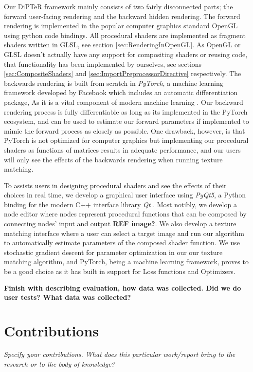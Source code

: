 Our DiPTeR framework mainly consists of two fairly disconnected parts; the forward user-facing rendering and the backward hidden rendering. The forward rendering is implemented in the popular computer graphics standard OpenGL using python code bindings. All procedural shaders are implemented as fragment shaders written in GLSL, see section \ref{sec:RenderingInOpenGL}. As OpenGL or GLSL doesn't actually have any support for compositing shaders or reusing code, that functionality has been implemented by ourselves, see sections \ref{sec:CompositeShaders} and \ref{sec:ImportPreprocessorDirective} respectively. The backwards rendering is built from scratch in \textit{PyTorch}, a machine learning framework developed by Facebook which includes an automatic differentiation package, As it is a vital component of modern machine learning \cite{paszke_2019_pytorch}. Our backward rendering process is fully differentiable as long as its implemented in the PyTorch ecosystem, and can be used to estimate our forward parameters if implemented to mimic the forward process as closely as possible. One drawback, however, is that PyTorch is not optimized for computer graphics but implementing our procedural shaders as functions of matrices results in adequate performance, and our users will only see the effects of the backwards rendering when running texture matching.

To assists users in designing procedural shaders and see the effects of their choices in real time, we develop a graphical user interface using \textit{PyQt5}, a Python binding for the modern C++ interface library \textit{Qt} \cite{theqtcompany_qt}. Most notibly, we develop a node editor where nodes represent procedural functions that can be composed by connecting nodes' input and output \textbf{REF image?}. We also develop a texture matching interface where a user can select a target image and run our algorithm to automatically estimate parameters of the composed shader function. We use stochastic gradient descent for parameter optimization in our our texture matching algorithm, and PyTorch, being a machine learning framework, proves to be a good choice as it has built in support for Loss functions and Optimizers.

\textbf{Finish with describing evaluation, how data was collected. Did we do user tests? What data was collected?}

\section{Contributions}
\textit{Specify your contributions. What does this particular work/report bring to the research or to the body of knowledge?}

